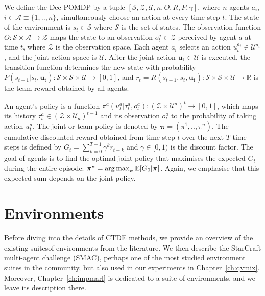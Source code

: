 We define the Dec-POMDP by a tuple $[\mathcal{S}, \mathcal{Z}, \mathcal{U}, n, O, R, P, \gamma]$, where $n$ agents $a_i$, $i \in \mathcal{A} \equiv \{1,..,n\}$, simultaneously choose an action at every time step $t$.
The state of the environment is $s_t \in \mathcal{S}$ where $\mathcal{S}$ is the set of states.
The observation function $O: \mathcal{S} \times \mathcal{A} \rightarrow \mathcal{Z}$ maps the state to an observation $o_t^{a} \in \mathcal{Z}$ perceived by agent $a$ at time $t$, where $\mathcal{Z}$ is the observation space.
Each agent $a_i$ selects an action $u_t^{a_i} \in \mathcal{U}^{a_i}$, and the joint action space is $\mathcal{U}$.
After the joint action $\boldsymbol{u_t} \in \mathcal{U}$ is executed, the transition function determines the new state with probability $P(s_{t+1}|s_t, \boldsymbol{u_t}): \mathcal{S} \times \mathcal{S} \times\mathcal{U} \rightarrow  [0,1] $, and $r_t=R(s_{t+1}, s_t, \boldsymbol {u_t}): \mathcal{S} \times \mathcal{S} \times \mathcal{U} \rightarrow \mathbb{R}$ is the team reward obtained by all agents.

An agent's policy is a function $\pi^{a}(u_t^{a}|\tau_t^{a},o_t^{a}): (\mathcal{Z} \times \mathcal{U}^a)^t \rightarrow [0,1]$, which maps its history $\tau_t^{a} \in (\mathcal{Z} \times \mathcal{U}_a)^{t-1}$ and its observation $o_t^{a}$ to the probability of taking action $u_t^{a}$. 
The joint or team policy is denoted by $\boldsymbol{\pi}=(\pi^1,..,\pi^n)$.
The cumulative discounted reward obtained from time step $t$ over the next $T$ time steps is defined by $G_{t} = \sum_{k=0}^{T-1} \gamma^k r_{t+k}$ and $\gamma \in [0, 1)$ is the discount factor.
The goal of agents is to find the optimal joint policy that maximises the expected $G_t$ during the entire episode: $\boldsymbol{\pi^{*}} =\operatorname*{arg\,max}_{\boldsymbol{\pi}} \mathbb{E}[G_0|\boldsymbol{\pi}]$.
Again, we emphasise that this expected sum depends on the joint policy.





\section{Environments}
\label{sec:ch3_env}
Before diving into the details of CTDE methods, we provide an overview of the existing suites\footnotemark of environments from the literature.
We then describe the StarCraft multi-agent challenge (SMAC), perhaps one of the most studied environment suites in the community, but also used in our experiments in Chapter~\ref{ch:qvmix}.
Moreover, Chapter~\ref{ch:impmarl} is dedicated to a suite of environments, and we leave its description there.


